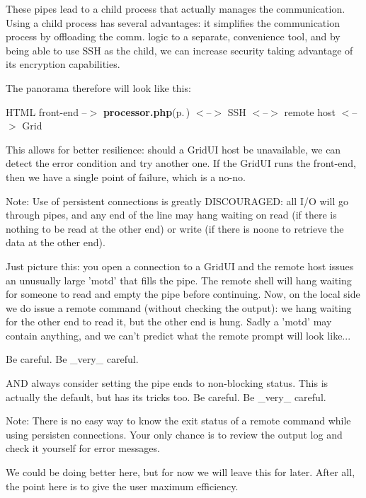 These pipes lead to a child process that actually manages the communication. Using a child process has several advantages: it simplifies the communication process by offloading the comm. logic to a separate, convenience tool, and by being able to use SSH as the child, we can increase security taking advantage of its encryption capabilities.

The panorama therefore will look like this:

HTML front-end --$>$ {\bf processor.php}{\rm (p.\,\pageref{processor_8php})} $<$--$>$ SSH $<$--$>$ remote host $<$--$>$ Grid

This allows for better resilience: should a Grid\-UI host be unavailable, we can detect the error condition and try another one. If the Grid\-UI runs the front-end, then we have a single point of failure, which is a no-no.

\begin{Desc}
\item[Note:]Use of persistent connections is greatly DISCOURAGED: all I/O will go through pipes, and any end of the line may hang waiting on read (if there is nothing to be read at the other end) or write (if there is noone to retrieve the data at the other end).\end{Desc}
Just picture this: you open a connection to a Grid\-UI and the remote host issues an unusually large 'motd' that fills the pipe. The remote shell will hang waiting for someone to read and empty the pipe before continuing. Now, on the local side we do issue a remote command (without checking the output): we hang waiting for the other end to read it, but the other end is hung. Sadly a 'motd' may contain anything, and we can't predict what the remote prompt will look like...

Be careful. Be \_\-very\_\- careful.

AND always consider setting the pipe ends to non-blocking status. This is actually the default, but has its tricks too. Be careful. Be \_\-very\_\- careful.

\begin{Desc}
\item[Note:]There is no easy way to know the exit status of a remote command while using persisten connections. Your only chance is to review the output log and check it yourself for error messages.\end{Desc}
We could be doing better here, but for now we will leave this for later. After all, the point here is to give the user maximum efficiency.

